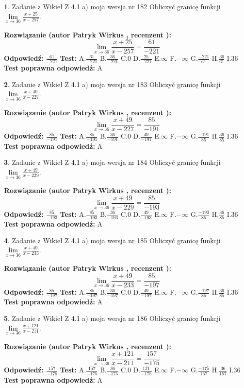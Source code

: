 \documentclass[12pt, a4paper]{article}
\theoremstyle{definition} %
\newtheorem{zad}{}
\newcommand{\zadStart}[1]{\begin{zad}#1\newline}
\newcommand{\zadStop}{\end{zad}}
\newcommand{\rozwStart}[2]{\noindent \textbf{Rozwiązanie (autor #1 , recenzent #2): }\newline}
\newcommand{\rozwStop}{\newline}
\newcommand{\odpStart}{\noindent \textbf{Odpowiedź:}\newline}
\newcommand{\odpStop}{\newline}
\newcommand{\testStart}{\noindent \textbf{Test:}\newline}
\newcommand{\testStop}{\newline}
\newcommand{\kluczStart}{\noindent \textbf{Test poprawna odpowiedź:}\newline}
\newcommand{\kluczStop}{\newline}
\begin{document}
\zadStart{Zadanie z Wikieł Z 4.1 a) moja wersja nr 182}
Obliczyć granicę funkcji $\lim\limits_{x\to36}\frac{x+25}{x-257}$.
\zadStop
\rozwStart{Patryk Wirkus}{}
$$\lim\limits_{x\to36}\frac{x+25}{x-257} = \frac{61}{-221}$$
\rozwStop
\odpStart
$\frac{61}{-221}$
\odpStop
\testStart
A.$\frac{61}{-221}$
B.$\frac{36}{-221}$
C.$0$
D.$\frac{25}{-221}$
E.$\infty$
F.$-\infty$
G.$\frac{-221}{61}$
H.$\frac{36}{61}$
I.$36$
\testStop
\kluczStart
A
\kluczStop



\zadStart{Zadanie z Wikieł Z 4.1 a) moja wersja nr 183}
Obliczyć granicę funkcji $\lim\limits_{x\to36}\frac{x+49}{x-227}$.
\zadStop
\rozwStart{Patryk Wirkus}{}
$$\lim\limits_{x\to36}\frac{x+49}{x-227} = \frac{85}{-191}$$
\rozwStop
\odpStart
$\frac{85}{-191}$
\odpStop
\testStart
A.$\frac{85}{-191}$
B.$\frac{36}{-191}$
C.$0$
D.$\frac{49}{-191}$
E.$\infty$
F.$-\infty$
G.$\frac{-191}{85}$
H.$\frac{36}{85}$
I.$36$
\testStop
\kluczStart
A
\kluczStop



\zadStart{Zadanie z Wikieł Z 4.1 a) moja wersja nr 184}
Obliczyć granicę funkcji $\lim\limits_{x\to36}\frac{x+49}{x-229}$.
\zadStop
\rozwStart{Patryk Wirkus}{}
$$\lim\limits_{x\to36}\frac{x+49}{x-229} = \frac{85}{-193}$$
\rozwStop
\odpStart
$\frac{85}{-193}$
\odpStop
\testStart
A.$\frac{85}{-193}$
B.$\frac{36}{-193}$
C.$0$
D.$\frac{49}{-193}$
E.$\infty$
F.$-\infty$
G.$\frac{-193}{85}$
H.$\frac{36}{85}$
I.$36$
\testStop
\kluczStart
A
\kluczStop



\zadStart{Zadanie z Wikieł Z 4.1 a) moja wersja nr 185}
Obliczyć granicę funkcji $\lim\limits_{x\to36}\frac{x+49}{x-233}$.
\zadStop
\rozwStart{Patryk Wirkus}{}
$$\lim\limits_{x\to36}\frac{x+49}{x-233} = \frac{85}{-197}$$
\rozwStop
\odpStart
$\frac{85}{-197}$
\odpStop
\testStart
A.$\frac{85}{-197}$
B.$\frac{36}{-197}$
C.$0$
D.$\frac{49}{-197}$
E.$\infty$
F.$-\infty$
G.$\frac{-197}{85}$
H.$\frac{36}{85}$
I.$36$
\testStop
\kluczStart
A
\kluczStop



\zadStart{Zadanie z Wikieł Z 4.1 a) moja wersja nr 186}
Obliczyć granicę funkcji $\lim\limits_{x\to36}\frac{x+121}{x-211}$.
\zadStop
\rozwStart{Patryk Wirkus}{}
$$\lim\limits_{x\to36}\frac{x+121}{x-211} = \frac{157}{-175}$$
\rozwStop
\odpStart
$\frac{157}{-175}$
\odpStop
\testStart
A.$\frac{157}{-175}$
B.$\frac{36}{-175}$
C.$0$
D.$\frac{121}{-175}$
E.$\infty$
F.$-\infty$
G.$\frac{-175}{157}$
H.$\frac{36}{157}$
I.$36$
\testStop
\kluczStart
A
\kluczStop
\end{document}
